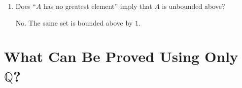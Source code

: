 \documentclass{self-check}
\begin{document}
\begin{enumerate}[label=\arabic{*}., itemsep=10pt]
    \begin{answer}
      No. For example,
      \[ A=\{q\in\mathbb{Q}:q<1\} \]
      has no greatest element but has supremum \(1\) in \(\mathbb{Q}\).
    \end{answer}
  \item Does ``\(A\) has no greatest element'' imply that \(A\) is unbounded above?

    \begin{answer}
      No. The same set is bounded above by \(1\).
    \end{answer}
\end{enumerate}

\section{What Can Be Proved Using Only \texorpdfstring{\(\mathbb{Q}\)}{Q}?}
\end{document}
